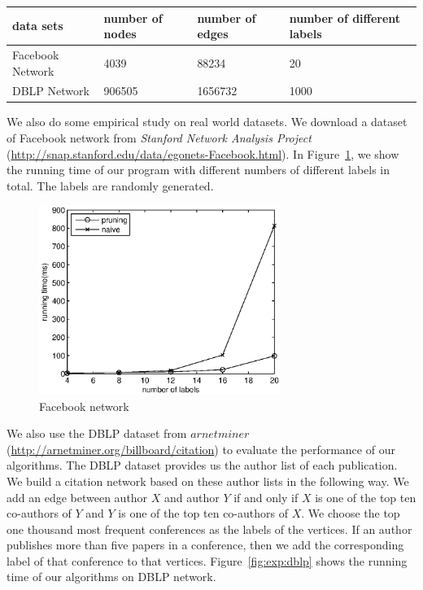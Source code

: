 \begin{table}[h]
    \centering
    \begin{tabular}{|l|l|l|l|}
    \hline
    data sets        & number of nodes & number of edges & number of different labels \\ \hline
    Facebook Network & 4039            & 88234           & 20                         \\ \hline
    DBLP Network     & 906505          & 1656732         & 1000                       \\ \hline
    \end{tabular}
    \label{tab:exp:fb_dblp}
\end{table}

We also do some empirical study on real world datasets. We download a dataset of Facebook network from \emph{Stanford Network Analysis Project} (\url{http://snap.stanford.edu/data/egonets-Facebook.html}). In Figure~\ref{fig:exp:fb}, we show the running time of our program with different numbers of different labels in total. The labels are randomly generated.

\begin{figure}[h]
    \centering
      \includegraphics[width=0.7\textwidth]{figs/FB}
    \caption{Facebook network}
    \label{fig:exp:fb}
\end{figure}


We also use the DBLP dataset from $arnetminer$ (\url{http://arnetminer.org/billboard/citation}) to evaluate the performance of our algorithms. The DBLP dataset provides us the author list of each publication. We build a citation network based on these author lists in the following way. We add an edge between author $X$ and author $Y$ if and only if $X$ is one of the top ten co-authors of $Y$ and $Y$ is one of the top ten co-authors of $X$. We choose the top one thousand most frequent conferences as the labels of the vertices. If an author publishes more than five papers in a conference, then we add the corresponding label of that conference to that vertices. Figure~\ref{fig:exp:dblp} shows the running time of our algorithms on DBLP network.


